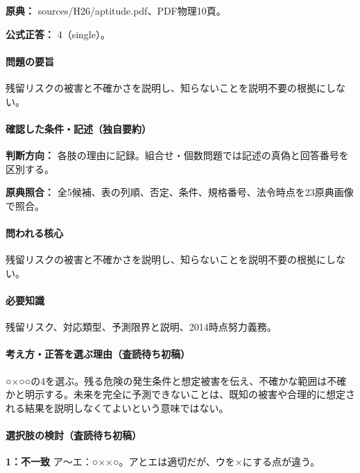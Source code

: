 \noindent\textbf{原典：} sources/H26/aptitude.pdf、PDF物理10頁。

\textbf{公式正答：} 4（single）。

\paragraph{問題の要旨} 残留リスクの被害と不確かさを説明し、知らないことを説明不要の根拠にしない。

\paragraph{確認した条件・記述（独自要約）}\mbox{}\par

\noindent\textbf{判断方向：} 各肢の理由に記録。組合せ・個数問題では記述の真偽と回答番号を区別する。\par

\noindent\textbf{原典照合：} 全5候補、表の列順、否定、条件、規格番号、法令時点を23原典画像で照合。\par

\paragraph{問われる核心} 残留リスクの被害と不確かさを説明し、知らないことを説明不要の根拠にしない。

\paragraph{必要知識} 残留リスク、対応類型、予測限界と説明、2014時点努力義務。

\paragraph{考え方・正答を選ぶ理由（査読待ち初稿）} ○×○○の4を選ぶ。残る危険の発生条件と想定被害を伝え、不確かな範囲は不確かと明示する。未来を完全に予測できないことは、既知の被害や合理的に想定される結果を説明しなくてよいという意味ではない。

\paragraph{選択肢の検討（査読待ち初稿）}\mbox{}\par

\noindent\textbf{1：不一致} ア〜エ：○××○。アとエは適切だが、ウを×にする点が違う。\par

